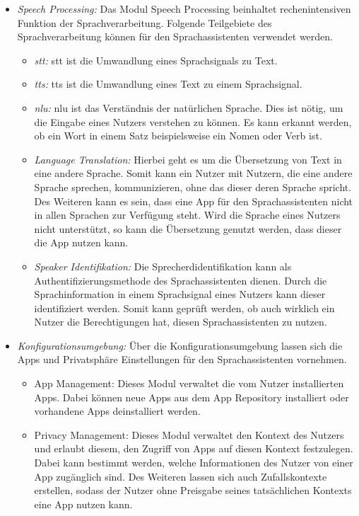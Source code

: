 \begin{itemize}
	\item \textsl{Speech Processing:} Das Modul Speech Processing beinhaltet rechenintensiven Funktion der Sprachverarbeitung. Folgende Teilgebiete des Sprachverarbeitung können für den Sprachassistenten verwendet werden.
	\begin{itemize}
		\item \textsl{\ac{stt}:} \ac{stt} ist die Umwandlung eines Sprachsignals zu Text.
		\item \textsl{\ac{tts}:} \ac{tts} ist die Umwandlung eines Text zu einem Sprachsignal.
		\item \textsl{\ac{nlu}:} \ac{nlu} ist das Verständnis der natürlichen Sprache. Dies ist nötig, um die Eingabe eines Nutzers verstehen zu können. Es kann erkannt werden, ob ein Wort in einem Satz beispielsweise ein Nomen oder Verb ist. 
		\item \textsl{Language Translation:} Hierbei geht es um die Übersetzung von Text in eine andere Sprache. Somit kann ein Nutzer mit Nutzern, die eine andere Sprache sprechen, kommunizieren, ohne das dieser deren Sprache spricht. Des Weiteren kann es sein, dass eine App für den Sprachassistenten nicht in allen Sprachen zur Verfügung steht. Wird die Sprache eines Nutzers nicht unterstützt, so kann die Übersetzung genutzt werden, dass dieser die App nutzen kann.
		\item \textsl{Speaker Identifikation:} Die Sprecherdidentifikation kann als Authentifizierungsmethode des Sprachassistenten dienen. Durch die Sprachinformation in einem Sprachsignal eines Nutzers kann dieser identifiziert werden. Somit kann geprüft werden, ob auch wirklich ein Nutzer die Berechtigungen hat, diesen Sprachassistenten zu nutzen.
	\end{itemize}
	\item \textsl{Konfigurationsumgebung:} Über die Konfigurationsumgebung lassen sich die Apps und Privatsphäre Einstellungen  für den Sprachassistenten vornehmen.
	\begin{itemize}
		\item App Management: Dieses Modul verwaltet die vom Nutzer installierten Apps. Dabei können neue Apps aus dem App Repository installiert oder vorhandene Apps deinstalliert werden. 	
		\item Privacy Management: Dieses Modul verwaltet den Kontext des Nutzers und erlaubt diesem, den Zugriff von Apps auf diesen Kontext festzulegen. Dabei kann bestimmt werden, welche Informationen des Nutzer von einer App zugänglich sind. Des Weiteren lassen sich auch Zufallskontexte erstellen, sodass der Nutzer ohne Preisgabe seines tatsächlichen Kontexts eine App nutzen kann.  
	\end{itemize}	
\end{itemize}





